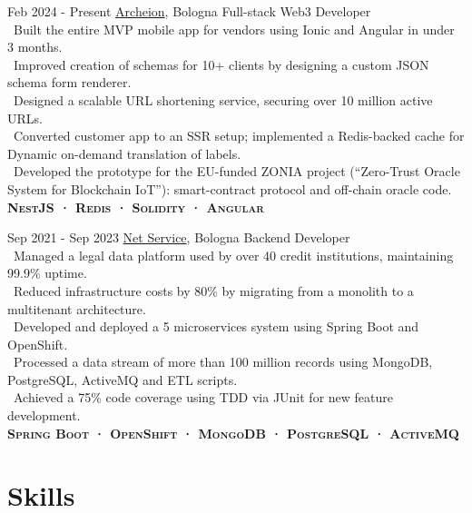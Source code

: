 \documentclass{tccv}
\begin{document}
\begin{eventlist}

     \item{Feb 2024 - Present}
     {\href{https://archeion.tech/}{Archeion}, Bologna}
     {Full-stack Web3 Developer} \\
     \textbullet~Built the entire MVP mobile app for vendors using Ionic and Angular in under 3 months. \\
     \textbullet~Improved creation of schemas for 10+ clients by designing a custom JSON schema form renderer. \\
     \textbullet~Designed a scalable URL shortening service, securing over 10 million active URLs. \\
     \textbullet~Converted customer app to an SSR setup; implemented a Redis-backed cache for Dynamic on-demand translation of labels. \\
     \textbullet~Developed the prototype for the EU-funded ZONIA project (“Zero-Trust Oracle System for Blockchain IoT”): smart-contract protocol and off-chain oracle code. \\
     \textbf{\textsc{NestJS · Redis · Solidity · Angular}}

     \item{Sep 2021 - Sep 2023}
     {\href{https://www.netservice.eu/}{Net Service}, Bologna}
     {Backend Developer} \\
     \textbullet~Managed a legal data platform used by over 40 credit institutions, maintaining 99.9\% uptime. \\
     \textbullet~Reduced infrastructure costs by 80\% by migrating from a monolith to a multitenant architecture. \\
     \textbullet~Developed and deployed a 5 microservices system using Spring Boot and OpenShift. \\
     \textbullet~Processed a data stream of more than 100 million records using MongoDB, PostgreSQL, ActiveMQ and ETL scripts. \\
     \textbullet~Achieved a 75\% code coverage using TDD via JUnit for new feature development. \\
     \textbf{\textsc{Spring Boot · OpenShift · MongoDB · PostgreSQL · ActiveMQ}}

\end{eventlist}


\section{Skills}
\end{document}

